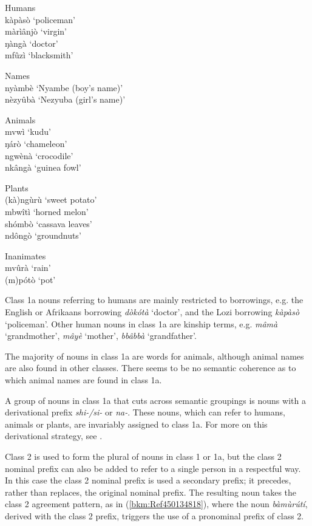\ea
\label{bkm:Ref98836715}
\ea Humans  \\
kàpàsò      ‘policeman’\\
    màrìânjò    ‘virgin’\\
    ŋàngà      ‘doctor’\\
    mfûzì      ‘blacksmith’

\ex
  Names  \\
  nyàmbè    ‘Nyambe (boy’s name)’\\
    nèzyûbà    ‘Nezyuba (girl’s name)’

\ex
  Animals  \\
  mvwì      ‘kudu’\\
    ŋárò      ‘chameleon’\\
    ngwènà    ‘crocodile’\\
    nkângà      ‘guinea fowl’

\ex
  Plants  \\
  (kà)ngùrù    ‘sweet potato’\\
    mbwîtì    ‘horned melon’\\
    shómbò    ‘cassava leaves’\\
    ndôngò    ‘groundnuts’

\ex
  Inanimates  \\
  mvûrà      ‘rain’\\
    (m)pótò    ‘pot’
\z\z

Class 1a nouns referring to humans are mainly restricted to borrowings, e.g. the English or Afrikaans borrowing \textit{dòkótà} ‘doctor’, and the Lozi borrowing \textit{kàpà\-sò} ‘policeman’. Other human nouns in class 1a are kinship terms, e.g. \textit{mâmà} ‘grandmother’, \textit{mâyè} ‘mother’, \textit{bbâbbà} ‘grandfather’.

The majority of nouns in class 1a are words for animals, although animal names are also found in other classes. There seems to be no semantic coherence as to which animal names are found in class 1a.

A group of nouns in class 1a that cuts across semantic groupings is nouns with a derivational prefix \textit{shi-/si-} or \textit{na-}. These nouns, which can refer to humans, animals or plants, are invariably assigned to class 1a. For more on this derivational strategy, see .

Class 2 is used to form the plural of nouns in class 1 or 1a, but the class 2 nominal prefix can also be added to refer to a single person in a respectful way. In this case the class 2 nominal prefix is used a secondary prefix; it precedes, rather than replaces, the original nominal prefix. The resulting noun takes the class 2 agreement pattern, as in (\ref{bkm:Ref450134818}), where the noun \textit{bàmùrútí}, derived with the class 2 prefix, triggers the use of a pronominal prefix of class 2.

